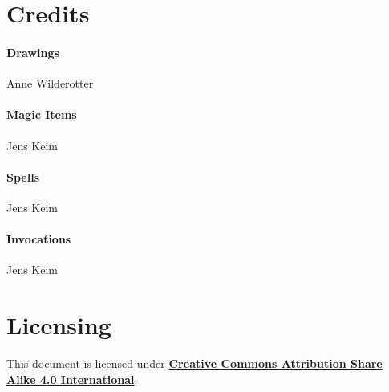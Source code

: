 \documentclass[letter,10pt,twocolumn,openany]{dndbook}
\begin{document}
\backmatter

\section{Credits}

\paragraph{Drawings} Anne Wilderotter
\paragraph{Magic Items} Jens Keim
\paragraph{Spells} Jens Keim
\paragraph{Invocations} Jens Keim

\section{Licensing}

This document is licensed under \href{https://creativecommons.org/licenses/by-sa/4.0/legalcode}{\textbf{Creative Commons Attribution Share Alike 4.0 International}}.
\end{document}

